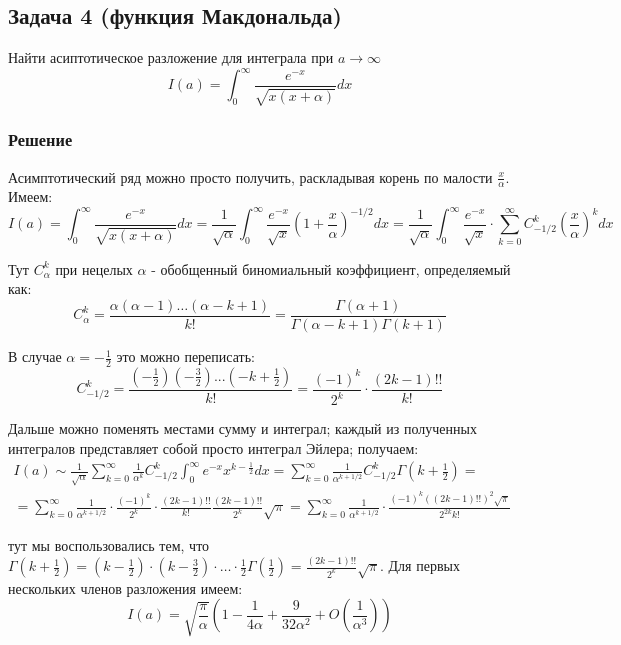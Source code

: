 \documentclass[a4paper,12pt]{article}
\begin{document}
\subsection*{Задача 4 (функция Макдональда)}

Найти асиптотическое разложение для интеграла при $a\to\infty$ 
\[
I(a)=\int_{0}^{\infty}\frac{e^{-x}}{\sqrt{x(x+\alpha)}}dx
\]



\subsubsection*{Решение}

Асимптотический ряд можно просто получить, раскладывая корень по малости
$\frac{x}{\alpha}$. Имеем:
\[
I\left(a\right)=\int_{0}^{\infty}\frac{e^{-x}}{\sqrt{x(x+\alpha)}}dx=\frac{1}{\sqrt{\alpha}}\int_{0}^{\infty}\frac{e^{-x}}{\sqrt{x}}\left(1+\frac{x}{\alpha}\right)^{-1/2}dx=\frac{1}{\sqrt{\alpha}}\int_{0}^{\infty}\frac{e^{-x}}{\sqrt{x}}\cdot\sum_{k=0}^{\infty}C_{-1/2}^{k}\left(\frac{x}{\alpha}\right)^{k}dx
\]

\noindent
Тут $C_{\alpha}^{k}$ при нецелых $\alpha$ - обобщенный биномиальный
коэффициент, определяемый как:
\[
C_{\alpha}^{k}=\frac{\alpha(\alpha-1)\dots(\alpha-k+1)}{k!}=\frac{\Gamma(\alpha+1)}{\Gamma(\alpha-k+1)\Gamma(k+1)}
\]

\noindent
В случае $\alpha=-\frac{1}{2}$ это можно переписать:
\[
C_{-1/2}^{k}
=
\frac{   \left(-\frac{1}{2}\right)  \left(-\frac{3}{2}\right)...\left(-k+\frac{1}{2}\right)}{k!} = \frac{(-1)^{k}}{2^{k}}\cdot\frac{(2k-1)!!}{k!}
\]

\noindent
Дальше можно поменять местами сумму и интеграл; каждый из полученных
интегралов представляет собой просто интеграл Эйлера; получаем:
\begin{multline*}
I(a)\sim\frac{1}{\sqrt{\alpha}}\sum_{k=0}^{\infty}\frac{1}{\alpha^{k}}C_{-1/2}^{k}\int_{0}^{\infty}e^{-x}x^{k-\frac{1}{2}}dx=\sum_{k=0}^{\infty}\frac{1}{\alpha^{k+1/2}}C_{-1/2}^{k}\Gamma\left(k+\frac{1}{2}\right)=\\
=\sum_{k=0}^{\infty}\frac{1}{\alpha^{k+1/2}}\cdot\frac{(-1)^{k}}{2^{k}}\cdot\frac{\left(2k-1\right)!!}{k!}\frac{\left(2k-1\right)!!}{2^{k}}\sqrt{\pi}=\sum_{k=0}^{\infty}\frac{1}{\alpha^{k+1/2}}\cdot\frac{(-1)^{k}((2k-1)!!)^{2}\sqrt{\pi}}{2^{2k}k!}
\end{multline*}

\noindent
тут мы воспользовались тем, что $\Gamma\left(k+\frac{1}{2}\right)=\left(k-\frac{1}{2}\right)\cdot\left(k-\frac{3}{2}\right)\cdot\dots\cdot\frac{1}{2}\Gamma\left(\frac{1}{2}\right)=\frac{(2k-1)!!}{2^{k}}\sqrt{\pi}$.
Для первых нескольких членов разложения имеем:
\[
I(a)=\sqrt{\frac{\pi}{\alpha}}\left(1-\frac{1}{4\alpha}+\frac{9}{32\alpha^{2}}+O\left(\frac{1}{\alpha^{3}}\right)\right)
\]
\end{document}
